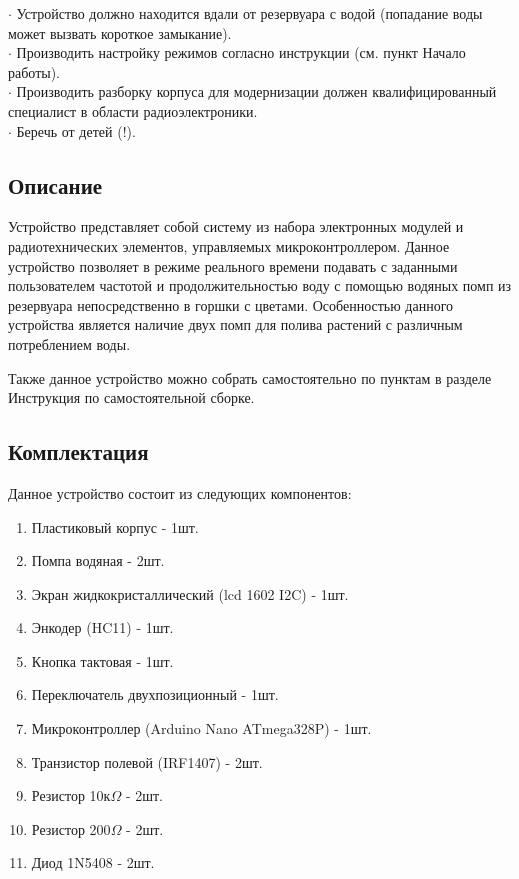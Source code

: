 \documentclass[12pt]{article}
\begin{document}
	$\cdot$ Устройство должно находится вдали от резервуара с водой (попадание воды может вызвать короткое замыкание).\\
	
	$\cdot$ Производить настройку режимов согласно инструкции (см. пункт Начало работы).\\
	
	$\cdot$ Производить разборку корпуса для модернизации должен квалифицированный специалист в области радиоэлектроники.\\
	
	$\cdot$ Беречь от детей (!).\\
	
	\subsection{Описание}
	
	Устройство представляет собой систему из набора электронных модулей и радиотехнических элементов, управляемых микроконтроллером. Данное устройство позволяет в режиме реального времени подавать с заданными пользователем частотой и продолжительностью воду с помощью водяных помп из резервуара непосредственно в горшки с цветами. Особенностью данного устройства является наличие двух помп для полива растений с различным потреблением воды.
	
	Также данное устройство можно собрать самостоятельно по пунктам в разделе Инструкция по самостоятельной сборке.
	
	\subsection{Комплектация}
	Данное устройство состоит из следующих компонентов:
	\begin{enumerate}
		\item Пластиковый корпус - 1шт.
		\item Помпа водяная - 2шт.
		\item Экран жидкокристаллический (lcd 1602 I2C) - 1шт.
		\item Энкодер (HC11) - 1шт.
		\item Кнопка тактовая - 1шт.
		\item Переключатель двухпозиционный - 1шт.
		\item Микроконтроллер (Arduino Nano ATmega328P) - 1шт.
		\item Транзистор полевой (IRF1407) - 2шт.
		\item Резистор 10к$\Omega$ - 2шт.
		\item Резистор 200$\Omega$ - 2шт.
		\item Диод 1N5408 - 2шт.
	\end{enumerate}
	
\end{document}
